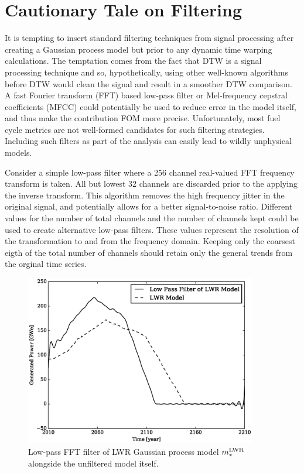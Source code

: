 \clearpage
\section{Cautionary Tale on Filtering}
\label{filtering}

It is tempting to insert standard filtering techniques from signal processing 
after creating a Gaussian process model but prior to any dynamic time warping 
calculations. The temptation comes from the fact that DTW is a signal 
processing technique and so, hypothetically, using other well-known algorithms
before DTW would clean the signal and result in a smoother DTW comparison.
A fast Fourier transform (FFT) based low-pass filter 
\cite{merletti1999standards,moreland2003fft} or 
Mel-frequency cepstral coefficients (MFCC) \cite{muda2010voice,imai1983cepstral} 
could potentially be used to reduce error in the model itself, 
and thus make the contribution FOM more precise. Unfortunately, most 
fuel cycle metrics are not well-formed candidates for such filtering strategies.
Including such filters as part of the analysis can easily lead to wildly unphysical
models.

Consider a simple low-pass filter where a 256 channel real-valued FFT frequency 
transform is taken.  All but lowest 32 channels are discarded prior to the applying 
the inverse transform. This algorithm removes the
high frequency jitter in the original signal, and 
potentially allows for a better signal-to-noise ratio. Different values
for the number of total channels and the number of channels kept could be 
used to create alternative low-pass filters. These values represent the 
resolution of the transformation to and from the frequency domain. Keeping
only the coarsest eigth of the total number of channels should retain only
the general trends from the orginal time series.

\begin{figure}[htb]
\centering
\includegraphics[width=0.9\textwidth]{fft-lwr-model.eps}
\caption{Low-pass FFT filter of LWR Gaussian process model $m_*^{\mathrm{LWR}}$ alongside
the unfiltered model itself.}
\label{fft-lwr-model}
\end{figure}

